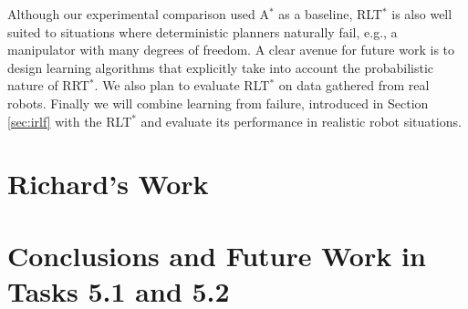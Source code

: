 \documentclass[a4paper,11pt]{report}
\begin{document}
 Although our experimental comparison used A$^*$ as a baseline, RLT$^*$ is also well suited to situations where deterministic planners naturally fail, e.g., a manipulator with many degrees of freedom. A clear avenue for future work is to design learning algorithms that explicitly take into account the probabilistic nature of RRT$^*$. We also plan to evaluate RLT$^*$ on data gathered from real robots. Finally we will combine learning from failure, introduced in Section \ref{sec:irlf} with the RLT$^*$ and evaluate its performance in realistic robot situations.


\section{Richard's Work}

\section{Conclusions and Future Work in Tasks 5.1 and 5.2}
\label{sec:conclusions}



\end{document}
